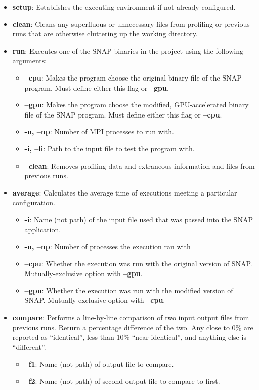 \documentclass[conference]{IEEEtran}
\begin{document}
\begin{itemize}
    \item \textbf{setup}: Establishes the executing environment if not already configured.
    \item \textbf{clean}: Cleans any superfluous or unnecessary files from profiling or previous runs that are otherwise cluttering up the working directory.
    \item \textbf{run}: Executes one of the SNAP binaries in the project using the following arguments:
    \begin{itemize}
        \item \textbf{--cpu}: Makes the program choose the original binary file of the SNAP program. Must define either this flag or \textbf{--gpu}.
        \item \textbf{--gpu}: Makes the program choose the modified, GPU-accelerated binary file of the SNAP program. Must define either this flag or \textbf{--cpu}.
        \item \textbf{-n, --np}: Number of MPI processes to run with.
        \item \textbf{-i, --fi}: Path to the input file to test the program with. 
        \item \textbf{--clean}: Removes profiling data and extraneous information and files from previous runs.
    \end{itemize}
    \item \textbf{average}: Calculates the average time of executions meeting a particular configuration.
    \begin{itemize}
        \item \textbf{-i}: Name (not path) of the input file used that was passed into the SNAP application.
        \item \textbf{-n, --np}: Number of processes the execution ran with
        \item \textbf{--cpu}: Whether the execution was run with the original version of SNAP. Mutually-exclusive option with \textbf{--gpu}.
        \item \textbf{--gpu}: Whether the execution was run with the modified version of SNAP. Mutually-exclusive option with \textbf{--cpu}.
    \end{itemize}
    \item \textbf{compare}: Performs a line-by-line comparison of two input output files from previous runs. Return a percentage difference of the two. Any close to 0\% are reported as ``identical'', less than 10\% ``near-identical'', and anything else is ``different''.
    \begin{itemize}
        \item \textbf{--f1}: Name (not path) of output file to compare.
        \item \textbf{--f2}: Name (not path) of second output file to compare to first.
    \end{itemize}
\end{itemize}
\end{document}
